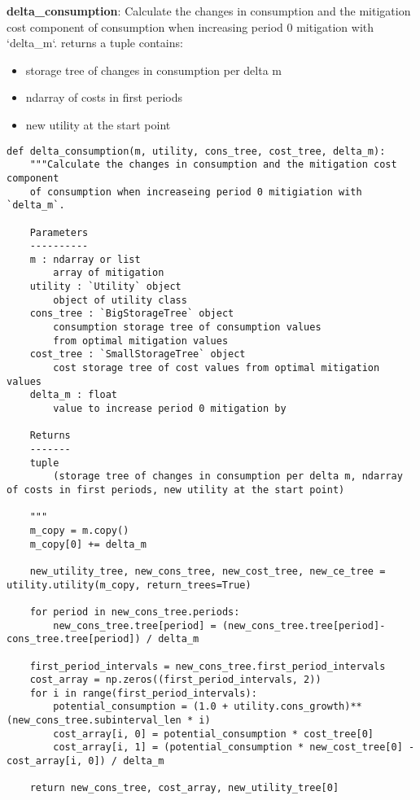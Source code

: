 \documentclass[12pt]{article}
\begin{document}
\textbf{delta\_consumption}: Calculate the changes in consumption and the mitigation cost component of consumption when increasing period 0 mitigation with `delta_m`.
returns a tuple contains:
\begin{itemize}
  \item storage tree of changes in consumption per delta m
  \item ndarray of costs in first periods
  \item new utility at the start point
\end{itemize}

\begin{verbatim}
def delta_consumption(m, utility, cons_tree, cost_tree, delta_m):
	"""Calculate the changes in consumption and the mitigation cost component
	of consumption when increaseing period 0 mitigiation with `delta_m`.

	Parameters
	----------
	m : ndarray or list
		array of mitigation
	utility : `Utility` object
		object of utility class
	cons_tree : `BigStorageTree` object
		consumption storage tree of consumption values
		from optimal mitigation values
	cost_tree : `SmallStorageTree` object
		cost storage tree of cost values from optimal mitigation values
	delta_m : float
		value to increase period 0 mitigation by
	
	Returns
	-------
	tuple
		(storage tree of changes in consumption per delta m, ndarray of costs in first periods, new utility at the start point)

	"""
	m_copy = m.copy()
	m_copy[0] += delta_m

	new_utility_tree, new_cons_tree, new_cost_tree, new_ce_tree = utility.utility(m_copy, return_trees=True)

	for period in new_cons_tree.periods:
		new_cons_tree.tree[period] = (new_cons_tree.tree[period]-cons_tree.tree[period]) / delta_m

	first_period_intervals = new_cons_tree.first_period_intervals
	cost_array = np.zeros((first_period_intervals, 2))
	for i in range(first_period_intervals):
		potential_consumption = (1.0 + utility.cons_growth)**(new_cons_tree.subinterval_len * i)
		cost_array[i, 0] = potential_consumption * cost_tree[0]
		cost_array[i, 1] = (potential_consumption * new_cost_tree[0] - cost_array[i, 0]) / delta_m
	
	return new_cons_tree, cost_array, new_utility_tree[0]
\end{verbatim}
\end{document}
